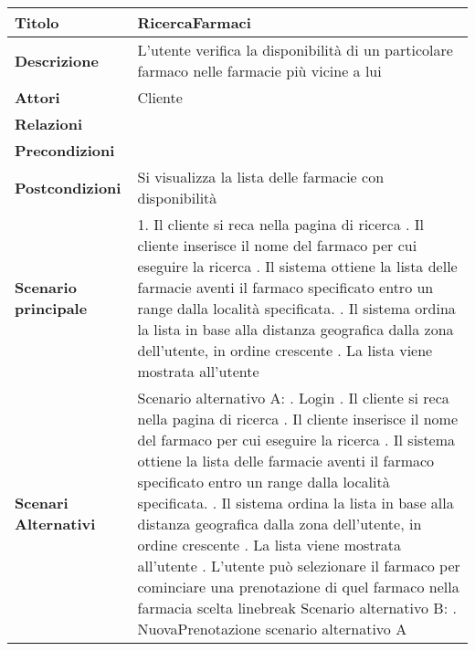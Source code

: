 \begin{tabular} {|P{4.5cm}|P{12.5cm}|}
  \hline
    \textbf{Titolo} & RicercaFarmaci\\
  \hline
    \textbf{Descrizione} & L'utente verifica la disponibilità di un particolare
    farmaco nelle farmacie più vicine a lui\\
  \hline
    \textbf{Attori} & Cliente\\
  \hline
    \textbf{Relazioni} &\\
  \hline
    \textbf{Precondizioni} &\\
  \hline
    \textbf{Postcondizioni} & Si visualizza la lista delle farmacie con disponibilità\\
  \hline
    \textbf{Scenario principale} & 
      1. Il cliente si reca nella pagina di ricerca . Il cliente inserisce il nome del farmaco per cui eseguire la ricerca . Il sistema ottiene la lista delle farmacie aventi il farmaco specificato entro un range dalla località specificata. . Il sistema ordina la lista in base alla distanza geografica dalla zona dell'utente, in ordine crescente . La lista viene mostrata all'utente\\
  \hline
    \textbf{Scenari Alternativi} &
      Scenario alternativo A: . Login . Il cliente si reca nella pagina di ricerca . Il cliente inserisce il nome del farmaco per cui eseguire la ricerca . Il sistema ottiene la lista delle farmacie aventi il farmaco specificato entro un range dalla località specificata. . Il sistema ordina la lista in base alla distanza geografica dalla zona dell'utente, in ordine crescente . La lista viene mostrata all'utente . L'utente può selezionare il farmaco per cominciare una prenotazione di quel farmaco nella farmacia scelta linebreak
      Scenario alternativo B: . NuovaPrenotazione scenario alternativo A \linebreak

\end{tabular}
